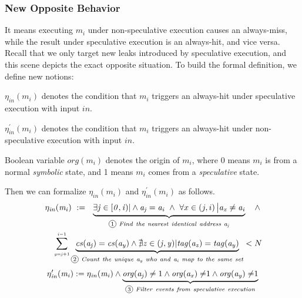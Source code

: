 \documentclass[sigconf]{acmart}
\newcommand*\circled[1]{\tikz[baseline=(char.base)]{
				\node[shape=circle,draw,inner sep=1pt] (char) {\scriptsize{#1}};}}
\begin{document}
\subsubsection{New Opposite Behavior}
\label{sec:new_opp}
It means executing $\mathit{m_i}$ under non-speculative execution causes an 
always-miss, while the result under speculative execution is an always-hit, 
and vice versa. Recall that we only target new leaks introduced by speculative 
execution, and this scene depicts the exact opposite situation. To build the 
formal definition, we define new notions: 
%
%
\begin{itemize*}
  \item $\mathit{\eta_{in}(m_i)}$ denotes the condition that $\mathit{m_i}$ 
	triggers an always-hit under speculative execution with input $\mathit{in}$.
  \item $\mathit{\eta^\prime_{in}(m_i)}$ denotes the condition that $\mathit{m_i}$ 
	triggers an always-hit under non-speculative execution with input $\mathit{in}$.
  \item Boolean variable $\mathit{org(m_i)}$ denotes the origin of $\mathit{m_i}$, 
  where 0 means $\mathit{m_i}$ is from a normal \textit{symbolic} state, and 1 
	means $\mathit{m_i}$ comes from a \textit{speculative} state.
\end{itemize*}
%
%
Then we can formalize $\mathit{\eta_{in}(m_i)}$ and $\mathit{\eta^\prime_{in}(m_i)}$ as follows. 
%
\begin{multline}
  \label{eqn:hc1}
    \mathit{\eta_{in}(m_i)}~:=~~ 
     \underbrace{ 
      \exists\mathit{j}\in[\mathit{0,i})|
      \wedge 
      \mathit{a_j}=\mathit{a_i} 
    ~\wedge~
      {\forall}x\in\left(j,i\right)\big|\mathit{a_x}\ne\mathit{a_i}
    }_{{\circled{1}}\mathit{~Find~the~nearest~identical~address~a_j}}
		~~~\wedge 
		\\
    ~~~~\sum_{{\scriptscriptstyle \mathit{y=j}+1}}^{{\scriptscriptstyle \mathit{i-}1}} 
    \underbrace{
      \mathit{cs(a_j)}=\mathit{cs(a_y)} 
      \wedge
      \nexists\mathit{z}\in(\mathit{j,y})|\mathit{tag(a_z)}=\mathit{tag(a_y)}
    }_{{\circled{2}}\mathit{~Count~the~unique~a_y~who~and~a_i~map~to~the~same~set}}
    <N
\end{multline}
\vspace{.2ex}
\begin{multline}
  \label{eqn:hc2}
    \mathit{\eta^\prime_{in}(m_i)}:=\mathit{\eta_{in}(m_i)}\wedge
    \underbrace{
      \mathit{org(a_j)}\ne1 
      \wedge
      \mathit{org(a_x)\ne}1 
      \wedge
      \mathit{org(a_y)\ne}1 
    }_{{\circled{3}}\mathit{~Filter~events~from~speculative~execution}}
\end{multline}
%
%
\end{document}
